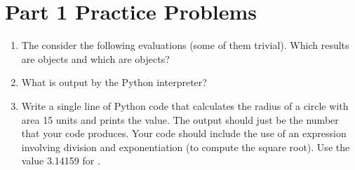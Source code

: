 \documentclass[letterpaper,10pt,english]{sphinxmanual}
\begin{document}
\section{Part 1 Practice Problems}
\label{\detokenize{lecture_notes/lec02_calculator:part-1-practice-problems}}\begin{enumerate}
\item {} 
The consider the following evaluations (some of them trivial).  Which results
are  objects and which are  objects?

%
\begin{sphinxVerbatim}[commandchars=\\\{\}]
            
           
          
          
         
          
         
        
\end{sphinxVerbatim}

\item {} 
What is output by the Python interpreter?

%
\begin{sphinxVerbatim}[commandchars=\\\{\}]
    
\end{sphinxVerbatim}

\item {} 
Write a single line of Python code that calculates the radius of a
circle with area 15 units and prints the value.  The output should
just be the number that your code produces.  Your code should include
the use of an expression involving division and exponentiation (to
compute the square root).  Use the value 3.14159 for .

\end{enumerate}
\end{document}
